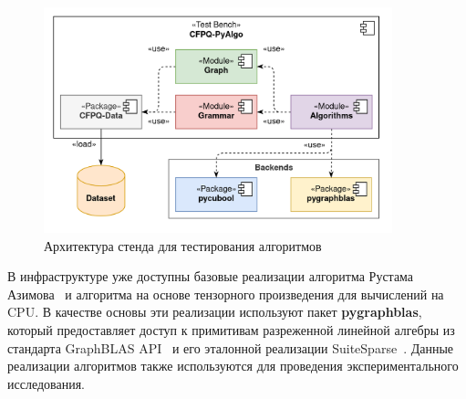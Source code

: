 \begin{figure}[]
    \centering
    \includegraphics[width=0.9\textwidth]{images/cfpq_pyalgo.png}
    \caption{Архитектура стенда для тестирования алгоритмов}
    \label{fig:cfpq_py_algo}
\end{figure}

В инфраструктуре уже доступны базовые реализации алгоритма Рустама Азимова~\cite{inproceedings:matrix_cfpq} и алгоритма на основе тензорного произведения для вычислений на CPU. 
В качестве основы эти реализации используют пакет \textbf{pygraphblas}, который предоставляет доступ к примитивам разреженной линейной алгебры из стандарта GraphBLAS API~\cite{paper:graphblas_foundations} и его эталонной реализации SuiteSparse~\cite{article:suite_sparse_for_graph_problems}. 
Данные реализации алгоритмов также используются для проведения экспериментального исследования.






